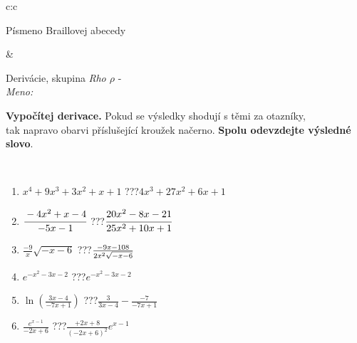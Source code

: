 \documentclass[10pt]{report}
\begin{document}
\begin{tabular}{c:c}
\begin{minipage}[c][104.5mm][t]{0.5\linewidth}
\begin{center}
\begin{minipage}{0.20\linewidth}
\begin{center}
{\small Písmeno Braillovej abecedy}
\end{center}
\end{minipage}
\end{center}
\end{minipage}
&
\begin{minipage}[c][104.5mm][t]{0.5\linewidth}
\begin{center}
\vspace{7mm}
{\huge Derivácie, skupina \textit{Rho $\rho$} -}\\[5mm]
\textit{Meno:}\phantom{xxxxxxxxxxxxxxxxxxxxxxxxxxxxxxxxxxxxxxxxxxxxxxxxxxxxxxxxxxxxxxxxx}\\[5mm]
\begin{minipage}{0.95\linewidth}
\begin{center}
\textbf{Vypočítej derivace.} Pokud se výsledky shodují s těmi za otazníky,\\tak napravo obarvi příslušející kroužek načerno. \textbf{Spolu odevzdejte výsledné slovo}.
\end{center}
\end{minipage}
\\[1mm]
\begin{minipage}{0.79\linewidth}
\begin{center}
\begin{varwidth}{\linewidth}
\begin{enumerate}
\normalsize
\item $x^4+9x^3+3x^2+x+1$\quad \dotfill\; ???\;\dotfill \quad $4x^3+27x^2+6x+1$
\item $\cfrac{-4x^2+x-4}{-5x-1}$\quad \dotfill\; ???\;\dotfill \quad $\cfrac{20x^2-8x-21}{25x^2+10x+1}$
\item $\frac{-9}{x}\sqrt{-x-6}$\quad \dotfill\; ???\;\dotfill \quad $\frac{-9x-108}{2x^2 \sqrt{\smash[b]{-x-6}}}$
\item $e^{-x^2-3x-2}$\quad \dotfill\; ???\;\dotfill \quad $e^{-x^2-3x-2}$
\item $\ln{\left(\frac{3x-4}{-7x+1}\right)}$\quad \dotfill\; ???\;\dotfill \quad $\frac{3}{3x-4}-\frac{-7}{-7x+1}$
\item $\frac{e^{x-1}}{-2x+6}$\quad \dotfill\; ???\;\dotfill \quad $\frac{+2x+8}{(-2x+6)^2}e^{x-1}$
\end{enumerate}
\end{varwidth}
\end{center}
\end{minipage}
\begin{minipage}{0.20\linewidth}
\begin{center}

\end{center}
\end{minipage}
\end{center}
\end{minipage}
\end{tabular}
\end{document}
